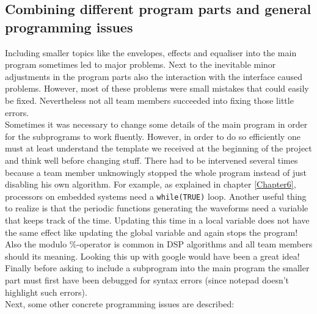 \subsection{Combining different program parts and general programming issues}
Including smaller topics like the envelopes, effects and equaliser into the main program sometimes led to major problems. Next to the inevitable minor adjustments in the program parts also the interaction with the interface caused problems. However, most of these problems were small mistakes that could easily be fixed. Nevertheless not all team members succeeded into fixing those little errors.\\
Sometimes it was necessary to change some details of the main program in order for the subprograms to work fluently. However, in order to do so efficiently one must at least understand the template we received at the beginning of the project and think well before changing stuff. There had to be intervened several times because a team member unknowingly stopped the whole program instead of just disabling his own algorithm. For example, as explained in chapter \ref{Chapter6}, processors on embedded systems need a \verb+while(TRUE)+ loop. Another useful thing to realize is that the periodic functions generating the waveforms need a variable that keeps track of the time. Updating this time in a local variable does not have the same effect like updating the global variable and again stops the program!\\
Also the modulo \%-operator is common in DSP algorithms and all team members should its meaning. Looking this up with google would have been a great idea!\\ Finally before asking to include a subprogram into the main program the smaller part must first have been debugged for syntax errors (since notepad doesn't highlight such errors).\\Next, some other concrete programming issues are described:
